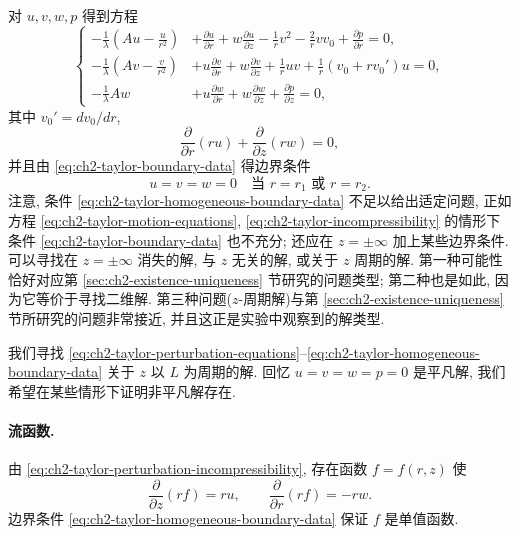 \hypertarget{chapter-02-page-167}{}
对 $u,v,w,p$ 得到方程
\begin{equation}
\left\{
\begin{aligned}
-\frac1\lambda\left(Au-\frac u{r^2}\right)
&+\frac{\partial u}{\partial r}
+w\frac{\partial u}{\partial z}
-\frac1rv^2-\frac2rvv_0+\frac{\partial p}{\partial r}=0,\\
-\frac1\lambda\left(Av-\frac v{r^2}\right)
&+u\frac{\partial v}{\partial r}
+w\frac{\partial v}{\partial z}
+\frac1ruv+\frac1r(v_0+rv_0')u=0,\\
-\frac1\lambda Aw
&+u\frac{\partial w}{\partial r}
+w\frac{\partial w}{\partial z}
+\frac{\partial p}{\partial z}=0,
\end{aligned}
\right.
\label{eq:ch2-taylor-perturbation-equations}
\end{equation}
其中 $v_0'=dv_0/dr$,
\begin{equation}
\frac\partial{\partial r}(ru)+\frac\partial{\partial z}(rw)=0,
\label{eq:ch2-taylor-perturbation-incompressibility}
\end{equation}
并且由 \eqref{eq:ch2-taylor-boundary-data} 得边界条件
\begin{equation}
u=v=w=0\quad\text{当 }r=r_1\text{ 或 }r=r_2.
\label{eq:ch2-taylor-homogeneous-boundary-data}
\end{equation}
注意, 条件 \eqref{eq:ch2-taylor-homogeneous-boundary-data} 不足以给出适定问题, 正如方程 \eqref{eq:ch2-taylor-motion-equations}, \eqref{eq:ch2-taylor-incompressibility} 的情形下条件 \eqref{eq:ch2-taylor-boundary-data} 也不充分; 还应在 $z=\pm\infty$ 加上某些边界条件. 可以寻找在 $z=\pm\infty$ 消失的解, 与 $z$ 无关的解, 或关于 $z$ 周期的解. 第一种可能性恰好对应第 \ref{sec:ch2-existence-uniqueness} 节研究的问题类型; 第二种也是如此, 因为它等价于寻找二维解. 第三种问题($z$-周期解)与第 \ref{sec:ch2-existence-uniqueness} 节所研究的问题非常接近, 并且这正是实验中观察到的解类型.

我们寻找 \eqref{eq:ch2-taylor-perturbation-equations}--\eqref{eq:ch2-taylor-homogeneous-boundary-data} 关于 $z$ 以 $L$ 为周期的解. 回忆 $u=v=w=p=0$ 是平凡解, 我们希望在某些情形下证明非平凡解存在.

\paragraph{流函数.}
\label{subsec:ch2-taylor-stream-function}
由 \eqref{eq:ch2-taylor-perturbation-incompressibility}, 存在函数 $f=f(r,z)$ 使
\begin{equation}
\frac\partial{\partial z}(rf)=ru,
\qquad
\frac\partial{\partial r}(rf)=-rw.
\label{eq:ch2-taylor-stream-function}
\end{equation}
边界条件 \eqref{eq:ch2-taylor-homogeneous-boundary-data} 保证 $f$ 是单值函数.


